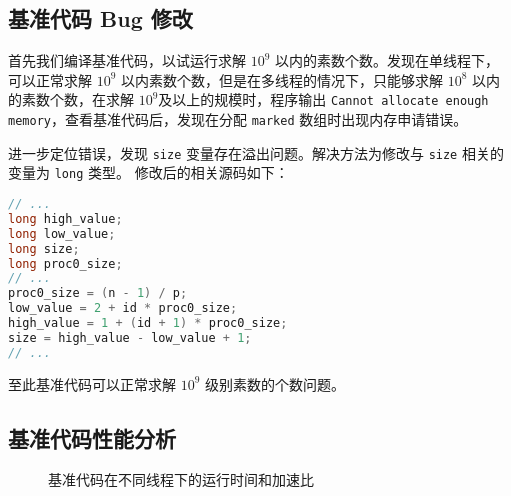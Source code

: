 \documentclass{article}
\begin{document}
  \subsection{基准代码 Bug 修改}
  首先我们编译基准代码，以试运行求解 $10^9$ 以内的素数个数。发现在单线程下，可以正常求解 $10^9$ 以内素数个数，但是在多线程的情况下，只能够求解 $10^8$ 以内的素数个数，在求解 $10^9$及以上的规模时，程序输出 \lstinline{Cannot allocate enough memory}，查看基准代码后，发现在分配 \verb|marked| 数组时出现内存申请错误。

  进一步定位错误，发现 \verb|size| 变量存在溢出问题。解决方法为修改与 \verb|size| 相关的变量为 \verb|long| 类型。 修改后的相关源码如下：
  \begin{file}
    \begin{lstlisting}[language=C++]
// ...
long high_value; 
long low_value;
long size;
long proc0_size;
// ...
proc0_size = (n - 1) / p;
low_value = 2 + id * proc0_size;
high_value = 1 + (id + 1) * proc0_size;
size = high_value - low_value + 1;
// ...
    \end{lstlisting}
  \end{file}

  至此基准代码可以正常求解 $10^9$ 级别素数的个数问题。

  \subsection{基准代码性能分析}
  \begin{figure}[h]
    \centering
    \label{fig:baseline}
    \caption{基准代码在不同线程下的运行时间和加速比}
  
  \end{figure}
\end{document}
